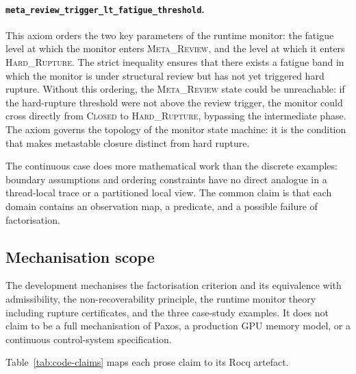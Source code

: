 \documentclass[a4paper,11pt]{article}
\begin{document}
\paragraph{\texttt{meta\_review\_trigger\_lt\_fatigue\_threshold}.}
This axiom orders the two key parameters of the runtime monitor: the fatigue
level at which the monitor enters \textsc{Meta\_Review}, and the level at which
it enters \textsc{Hard\_Rupture}. The strict inequality ensures that there
exists a fatigue band in which the monitor is under structural review but has
not yet triggered hard rupture. Without this ordering, the
\textsc{Meta\_Review} state could be unreachable: if the hard-rupture threshold
were not above the review trigger, the monitor could cross directly from
\textsc{Closed} to \textsc{Hard\_Rupture}, bypassing the intermediate phase.
The axiom governs the topology of the monitor state machine: it is the
condition that makes metastable closure distinct from hard rupture.

The continuous case does more mathematical work than the discrete examples:
boundary assumptions and ordering constraints have no direct analogue in a
thread-local trace or a partitioned local view. The common claim is that each
domain contains an observation map, a predicate, and a possible failure of
factorisation.

\subsection{Mechanisation scope}

The development mechanises the factorisation criterion and its equivalence with
admissibility, the non-recoverability principle, the runtime monitor theory
including rupture certificates, and the three case-study examples. It does not
claim to be a full mechanisation of Paxos, a production GPU memory model, or a
continuous control-system specification.

Table~\ref{tab:code-claims} maps each prose claim to its Rocq artefact.
\end{document}
